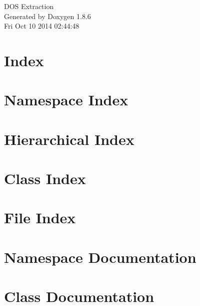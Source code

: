 \documentclass[twoside]{book}
\newcommand{\clearemptydoublepage}{%
  \newpage{\pagestyle{empty}\cleardoublepage}%
}
\begin{document}
\hypersetup{pageanchor=false}
\begin{titlepage}
\vspace*{7cm}
\begin{center}%
{\Large D\-O\-S Extraction }\\
\vspace*{1cm}
{\large Generated by Doxygen 1.8.6}\\
\vspace*{0.5cm}
{\small Fri Oct 10 2014 02:44:48}\\
\end{center}
\end{titlepage}
\clearemptydoublepage
\tableofcontents
\clearemptydoublepage
{}
\hypersetup{pageanchor=true}

\chapter{Index}
\label{index}\hypertarget{index}{}
\chapter{Namespace Index}

\chapter{Hierarchical Index}

\chapter{Class Index}

\chapter{File Index}

\chapter{Namespace Documentation}



\chapter{Class Documentation}


















\end{document}
